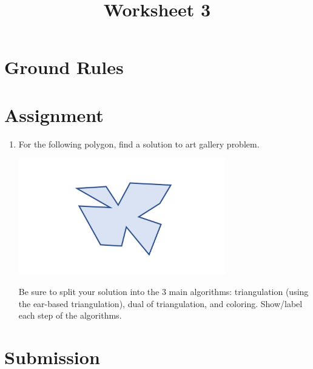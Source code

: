 \documentclass[a4paper,12pt]{article}
\title{Worksheet 3}
\begin{document}
\maketitle


\vspace{5pt}
\section{Ground Rules}


\vspace{5pt}
\section{Assignment}

\begin{enumerate}
\item For the following polygon, find a solution to art gallery problem. 

\begin{center}
\includegraphics[width=9cm]{../images/worksheet3.pdf}
\end{center}

Be sure to split your solution into the 3 main algorithms: triangulation (using the ear-based triangulation), dual of triangulation, and coloring. Show/label each step of the algorithms. 

\end{enumerate}


\section{Submission}

\end{document}
